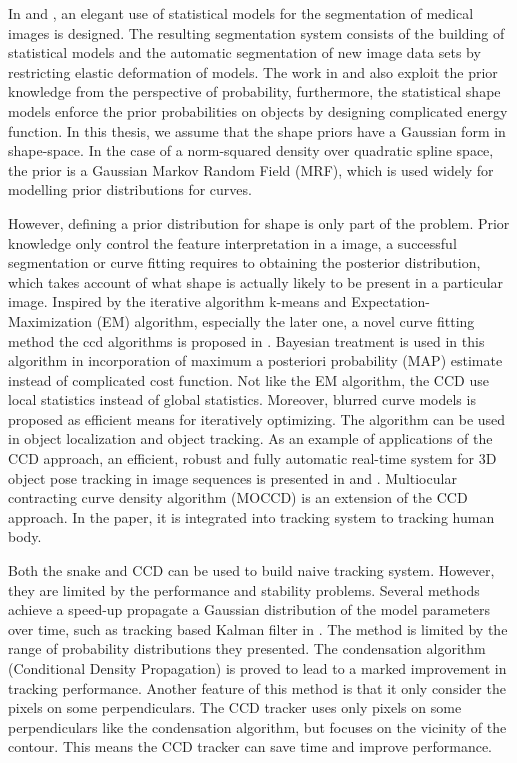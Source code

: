 In \cite{kelemen1999three} and \cite{kelemen1999elastic}, an elegant
use of statistical models for the segmentation of medical images is
designed.  The resulting segmentation system consists of the building
of statistical models and the automatic segmentation of new image data
sets by restricting elastic deformation of models.  The work in
\cite{sclaroff2001deformable} and \cite{liu1999deformable} also
exploit the prior knowledge from the perspective of probability,
furthermore, the statistical shape models enforce the prior
probabilities on objects by designing complicated energy function.  In this thesis, we assume that the shape priors have a Gaussian form in
shape-space. In the case of a norm-squared density over  quadratic spline space,
the prior is a Gaussian Markov Random Field
(MRF)\cite{blake1998active}, which is used widely  for modelling prior
distributions for curves\cite{storvik1994bayesian}.


However, defining a prior distribution for shape is only part of the
problem. Prior knowledge only control the feature interpretation in a
image, a successful segmentation or curve fitting requires to
obtaining the posterior distribution, which takes account of what
shape is actually likely to be present in a particular image. Inspired
by the iterative algorithm k-means\cite{ding2004k} and
Expectation-Maximization (EM)\cite{dempster1977maximum} algorithm, especially the later one, a novel
curve fitting method the ccd algorithms is proposed in
\cite{hanek2004contracting}. Bayesian treatment is used in this
algorithm in incorporation of maximum a posteriori probability (MAP)
\cite{sorenson1980parameter} estimate instead of complicated cost
function. Not like the EM algorithm, the CCD use local statistics
instead of global statistics. Moreover, blurred curve models is
proposed as efficient means for iteratively optimizing. The algorithm
can be used in object localization and object tracking. As an example
of applications of the CCD approach, an efficient, robust and fully
automatic real-time system for 3D object pose tracking in
image sequences is presented in \cite{panin2006fully} and
\cite{panin2006efficient}. Multiocular contracting curve density
algorithm (MOCCD) \cite{hahn2007tracking} is an extension of the CCD
approach. In the paper, it is integrated into tracking system to
tracking human body. 

Both the snake and CCD can be used to build naive tracking
system. However, they are limited by the performance and stability
problems. Several methods achieve a speed-up propagate a Gaussian
distribution of the model parameters over time, such as tracking based
Kalman filter in \cite{brookner1998tracking}. The method is limited by the range of probability
distributions they presented. The condensation algorithm (Conditional
Density Propagation) \cite{isard1998icondensation} is proved to lead
to a marked improvement in tracking performance. Another feature of
this method is that it only consider the pixels on some
perpendiculars. The CCD tracker \cite{hanek2004fitting} uses only
pixels on some perpendiculars like the condensation algorithm, but
focuses on the vicinity of the contour. This means the CCD tracker can
save time and improve performance.
